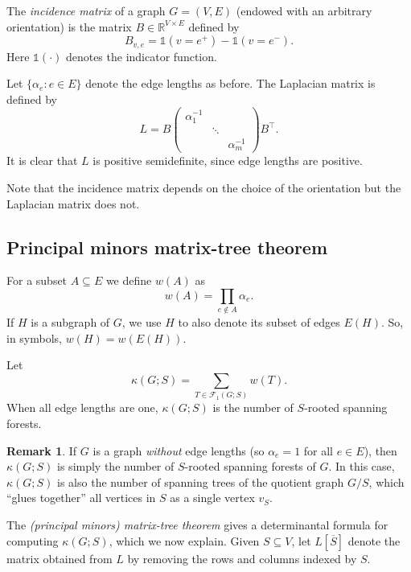 \documentclass[12pt]{amsart}
\theoremstyle{definition}
\newtheorem{rmk}[thm]{Remark}
\newcommand{\RR}{\mathbb{R}}
\newcommand{\one}{\mathds{1}}
\newcommand{\La}{L}
\newcommand{\tr}{\intercal}
\newcommand{\trees}{\mathcal{F}_1}
\begin{document}
The {\em incidence matrix} of a graph $G = (V,E)$ (endowed with an arbitrary orientation) is the matrix $B \in \RR^{V \times E}$ defined by
\[
	B_{v, e} = \one(v = e^+) - \one(v = e^-).
\]
Here $\one(\cdot)$ denotes the indicator function.

Let $\{ \alpha_e \colon e \in E\}$ denote the edge lengths as before. 
The Laplacian matrix is defined by
\begin{equation}
\label{eq:weighted-laplacian}
	\La = B \begin{pmatrix}
	\alpha_1^{-1} & & \\
	& \ddots & \\
	& & \alpha_m^{-1}
	\end{pmatrix} B^\tr .
\end{equation}
It is clear that $\La$ is positive semidefinite, since edge lengths are positive. 

Note that the incidence matrix depends on the choice of the orientation but the Laplacian matrix does not.


\subsection{Principal minors matrix-tree theorem}

For a subset $A \subseteq E$ we define $w(A)$ as
\[
	w(A) = \prod_{e \not\in A} \alpha_e .
\]
If $H$ is a subgraph of $G$, we use $H$ to also denote its subset of edges $E(H)$. So, in symbols, $w(H) = w\left(E(H)\right)$.

Let 
\[
	\kappa(G;S) = \sum_{T \in \trees(G; S)} w(T) .
\]
When all edge lengths are one, $\kappa(G; S)$ is the number of $S$-rooted spanning forests.

\begin{rmk}
If $G$ is a graph {\em without} edge lengths (so $\alpha_e=1$ for all $e \in E$), then $\kappa(G;S)$ is simply the number of $S$-rooted spanning forests of $G$.
In this case, $\kappa(G;S)$ is also the number of spanning trees of the quotient graph $G / S$, which ``glues together'' all vertices in $S$ as a single vertex $v_S$.
\end{rmk}


The {\em (principal minors) matrix-tree theorem} gives a determinantal formula for computing $\kappa(G;S)$, which we now explain. 
Given $S \subseteq V$, let $L[\overline S]$ denote the matrix obtained from $L$ by removing the rows and columns indexed by $S$.
\end{document}
